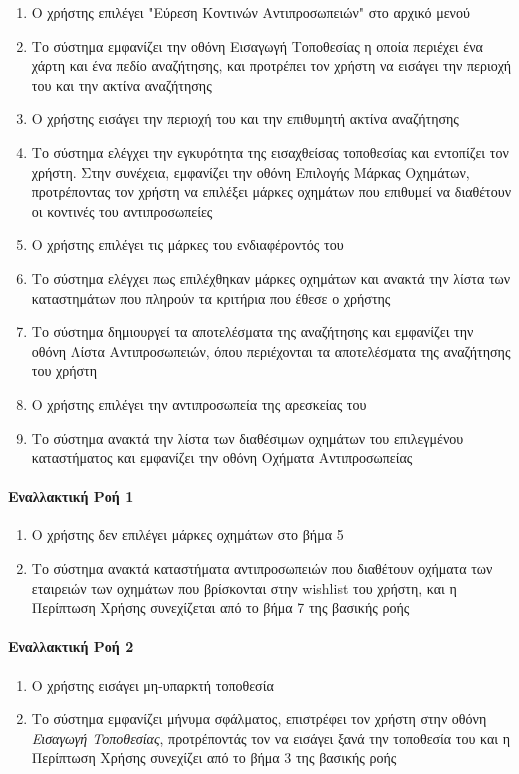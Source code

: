 \documentclass{../ol-softwaremanual}
\begin{document}
	\begin{enumerate}
		\item Ο χρήστης επιλέγει  \en"\gr Εύρεση Κοντινών Αντιπροσωπειών\en" \gr στο αρχικό μενού
		\item Το σύστημα εμφανίζει την οθόνη Εισαγωγή Τοποθεσίας η οποία περιέχει ένα χάρτη και ένα πεδίο αναζήτησης, και προτρέπει τον χρήστη να εισάγει την περιοχή του και την ακτίνα αναζήτησης
		\item Ο χρήστης εισάγει την περιοχή του και την επιθυμητή ακτίνα αναζήτησης		
		\item Το σύστημα ελέγχει την εγκυρότητα της εισαχθείσας τοποθεσίας και εντοπίζει τον χρήστη. Στην συνέχεια, εμφανίζει την οθόνη Επιλογής Μάρκας Οχημάτων, προτρέποντας τον χρήστη να επιλέξει μάρκες οχημάτων που επιθυμεί να διαθέτουν οι κοντινές του αντιπροσωπείες
		\item Ο χρήστης επιλέγει τις μάρκες του ενδιαφέροντός του			
		\item Το σύστημα ελέγχει πως επιλέχθηκαν μάρκες οχημάτων και ανακτά την λίστα των καταστημάτων που πληρούν τα κριτήρια που έθεσε ο χρήστης
		\item Το σύστημα δημιουργεί τα αποτελέσματα της αναζήτησης και εμφανίζει την οθόνη Λίστα Αντιπροσωπειών, όπου περιέχονται τα αποτελέσματα της αναζήτησης του χρήστη
		\item Ο χρήστης επιλέγει την αντιπροσωπεία της αρεσκείας του
		\item Το σύστημα ανακτά την λίστα των διαθέσιμων οχημάτων του επιλεγμένου καταστήματος και εμφανίζει την οθόνη Οχήματα Αντιπροσωπείας
	\end{enumerate}
	
	\paragraph{Εναλλακτική Ροή 1}
	\begin{enumerate}
		\item Ο χρήστης δεν επιλέγει μάρκες οχημάτων στο βήμα 5
		\item Το σύστημα ανακτά καταστήματα αντιπροσωπειών που διαθέτουν οχήματα των εταιρειών των οχημάτων που βρίσκονται στην \en wishlist \gr του χρήστη, και η Περίπτωση Χρήσης συνεχίζεται από το βήμα 7 της βασικής ροής
	\end{enumerate}
	
	\paragraph{Εναλλακτική Ροή 2}
	\begin{enumerate}
		\item Ο χρήστης εισάγει μη-υπαρκτή τοποθεσία
		\item Το σύστημα εμφανίζει μήνυμα σφάλματος, επιστρέφει τον χρήστη στην οθόνη \textit{Εισαγωγή Τοποθεσίας}, προτρέποντάς τον να εισάγει ξανά την τοποθεσία του και η Περίπτωση Χρήσης συνεχίζει από το βήμα 3 της βασικής ροής		
	\end{enumerate}
	
\end{document}

